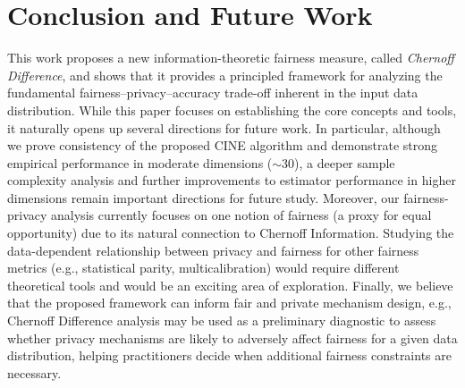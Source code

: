 \documentclass[11pt,letterpaper]{article}
\begin{document}
\section{Conclusion and Future Work}\label{sec:conclusion}
This work proposes a new information-theoretic fairness measure, called \textit{Chernoff Difference},
and shows that it provides a principled framework for analyzing the fundamental fairness–privacy–accuracy trade-off inherent in the input data distribution. While this paper focuses on establishing the core concepts and tools, it naturally opens up several directions for future work. In particular, although we prove consistency of the proposed CINE algorithm and demonstrate strong empirical performance in moderate dimensions ($\sim$30), a deeper sample complexity analysis and further improvements to estimator performance in higher dimensions remain important directions for future study. 
Moreover, our fairness-privacy analysis currently focuses on one notion of fairness (a proxy for equal opportunity) due to its natural connection to Chernoff Information. Studying the  data-dependent relationship between privacy and fairness for  other fairness metrics (e.g., statistical parity, multicalibration) would require different theoretical tools and would be an exciting area of exploration. 
Finally, we believe that the proposed framework can inform fair and private mechanism design,
e.g., Chernoff Difference analysis may be used as a preliminary diagnostic to assess whether privacy mechanisms are likely to adversely affect fairness for a given data distribution, helping practitioners decide when additional fairness constraints are necessary. 
%
\end{document}
